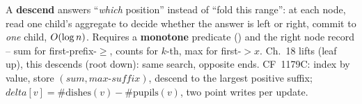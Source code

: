 \begin{recallbox}
A \textbf{descend} answers ``\emph{which} position'' instead of ``fold this
range'': at each node, read one child's aggregate to decide whether the answer is
left or right, commit to \emph{one} child, \(O(\log n)\).  Requires a
\textbf{monotone} predicate () and the right node record --
sum for first-prefix-\(\ge\), counts for \(k\)-th, max for first-\(>x\).
Ch.~18 lifts (leaf up), this descends (root down): same search, opposite ends.
CF~1179C: index by value, store \((\mathit{sum},\mathit{max\text{-}suffix})\),
descend to the largest positive suffix; \(\mathit{delta}[v]=\#\text{dishes}(v)-
\#\text{pupils}(v)\), two point writes per update.
\end{recallbox}
